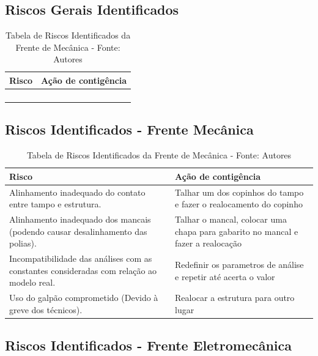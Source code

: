 \subsection*{Riscos Gerais Identificados}

\begin{table}[H]
    \begin{tabular}{|p{7cm}|p{7cm}|}
        \hline
        \textbf{Risco} & \textbf{Ação de contigência} \\ \hline
         &  \\ \hline
         & \\ \hline
         & \\ \hline
         & \\ \hline
    \end{tabular}
    \caption{Tabela de Riscos Identificados da Frente de Mecânica - Fonte: Autores}
    \label{tab:tabela_riscos_mecanica}
\end{table}

\subsection*{Riscos Identificados - Frente Mecânica}

\begin{table}[H]
    \begin{tabular}{|p{7cm}|p{7cm}|}
        \hline
        \textbf{Risco} & \textbf{Ação de contigência} \\ \hline
        Alinhamento inadequado do contato entre tampo e estrutura. & Talhar um dos copinhos do tampo e fazer o realocamento do copinho \\ \hline
        Alinhamento inadequado dos mancais (podendo causar desalinhamento das polias). & Talhar o mancal, colocar uma chapa para gabarito no mancal e fazer a realocação \\ \hline
        Incompatibilidade das análises com as constantes consideradas com relação ao modelo real. & Redefinir os parametros de análise e repetir até acerta o valor \\ \hline
        Uso do galpão comprometido (Devido à greve dos técnicos). & Realocar a estrutura para outro lugar \\ \hline
    \end{tabular}
    \caption{Tabela de Riscos Identificados da Frente de Mecânica - Fonte: Autores}
    \label{tab:tabela_riscos_mecanica}
\end{table}

\subsection*{Riscos Identificados - Frente Eletromecânica}

